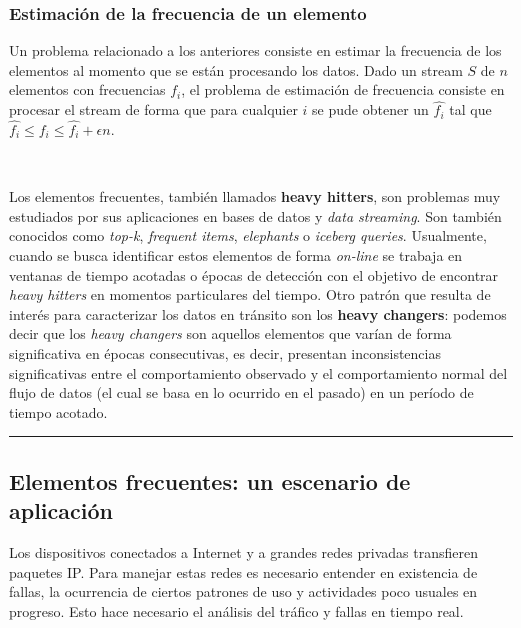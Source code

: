 \documentclass[a4paper,10pt, oneside]{article}
\begin{document}
\subsubsection{Estimación de la frecuencia de un elemento}
Un problema relacionado a los anteriores consiste en estimar la frecuencia de los elementos al momento que se están procesando los datos. Dado un stream $S$ de $n$ elementos con frecuencias $f_i$, el problema de estimación de frecuencia consiste en procesar el stream de forma que para cualquier $i$ se pude obtener un $\hat{f_i}$ tal que $\hat{f_i} \leq f_i \leq \hat{f_i}+\epsilon n$.

\

Los elementos frecuentes, también llamados \textbf{heavy hitters}, son problemas muy estudiados por sus aplicaciones en bases de datos y \textit{data streaming}. Son también conocidos como \textit{top-k}, \textit{frequent items}, \textit{elephants} o \textit{iceberg queries}. Usualmente, cuando se busca identificar estos elementos de forma \textit{on-line} se trabaja en ventanas de tiempo acotadas o épocas de detección con el objetivo de encontrar \textit{heavy hitters} en momentos particulares del tiempo. Otro patrón que resulta de interés para caracterizar los datos en tránsito son los \textbf{heavy changers}: podemos decir que los \textit{heavy changers} son aquellos elementos que varían de forma significativa en épocas consecutivas, es decir, presentan inconsistencias significativas entre el comportamiento observado y el comportamiento normal del flujo de datos (el cual se basa en lo ocurrido en el pasado) en un período de tiempo acotado\cite{Tong:2016:HTS:2927964.2927977}.

\begin{center}
	\rule{4in}{0.3pt}
\end{center}

\subsection{Elementos frecuentes: un escenario de aplicación}
Los dispositivos conectados a Internet y a grandes redes privadas transfieren paquetes IP. Para manejar estas redes es necesario entender en existencia de fallas, la ocurrencia de ciertos patrones de uso y actividades poco usuales en progreso. Esto hace necesario el análisis del tráfico y fallas en tiempo real.
\end{document}
